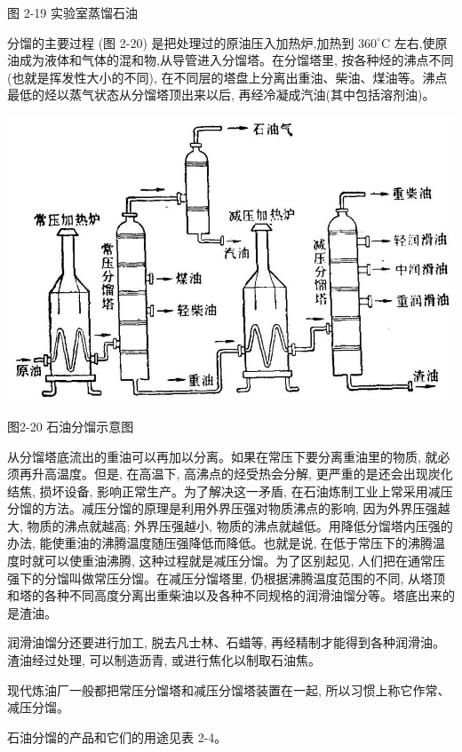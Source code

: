 \documentclass[10pt]{article}
\begin{document}
图 2-19 实验室蒸馏石油

分馏的主要过程 (图 2-20) 是把处理过的原油压入加热炉,加热到 \({360}^{ \circ }\mathrm{C}\) 左右,使原油成为液体和气体的混和物,从导管进入分馏塔。在分馏塔里, 按各种烃的沸点不同 (也就是挥发性大小的不同), 在不同层的塔盘上分离出重油、柴油、煤油等。沸点最低的烃以蒸气状态从分馏塔顶出来以后, 再经冷凝成汽油(其中包括溶剂油)。

\begin{center}
\includegraphics[max width=1.0\textwidth]{images/01912d16-be99-77bb-9535-4f3ed8d9946f_94_800860.jpg}
\end{center}

图2-20 石油分馏示意图

从分馏塔底流出的重油可以再加以分离。如果在常压下要分离重油里的物质, 就必须再升高温度。但是, 在高温下, 高沸点的烃受热会分解, 更严重的是还会出现炭化结焦, 损坏设备, 影响正常生产。为了解决这一矛盾, 在石油炼制工业上常采用减压分馏的方法。减压分馏的原理是利用外界压强对物质沸点的影响, 因为外界压强越大, 物质的沸点就越高; 外界压强越小, 物质的沸点就越低。用降低分馏塔内压强的办法, 能使重油的沸腾温度随压强降低而降低。也就是说, 在低于常压下的沸腾温度时就可以使重油沸腾, 这种过程就是减压分馏。为了区别起见, 人们把在通常压强下的分馏叫做常压分馏。在减压分馏塔里, 仍根据沸腾温度范围的不同, 从塔顶和塔的各种不同高度分离出重柴油以及各种不同规格的润滑油馏分等。塔底出来的是渣油。

润滑油馏分还要进行加工, 脱去凡士林、石蜡等, 再经精制才能得到各种润滑油。渣油经过处理, 可以制造沥青, 或进行焦化以制取石油焦。

现代炼油厂一般都把常压分馏塔和减压分馏塔装置在一起, 所以习惯上称它作常、减压分馏。

石油分馏的产品和它们的用途见表 2-4。
\end{document}
